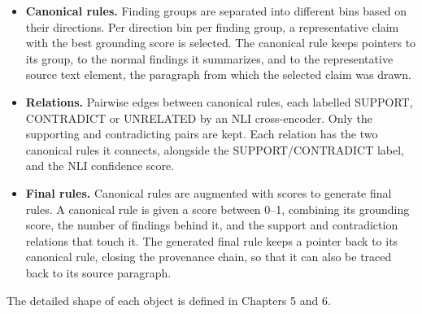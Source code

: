 \begin{itemize}[label={}, leftmargin=1.5em, itemsep=0.4em]
    \item \textbf{Canonical rules.} Finding groups are separated into different bins based on their directions. Per direction bin per finding group, a representative claim with the best grounding score is selected. The canonical rule keeps pointers to its group, to the normal findings it summarizes, and to the representative source text element, the paragraph from which the selected claim was drawn.

    \item \textbf{Relations.} Pairwise edges between canonical rules, each labelled SUPPORT, CONTRADICT or UNRELATED by an NLI cross-encoder. Only the supporting and contradicting pairs are kept. Each relation has the two canonical rules it connects, alongside the SUPPORT/CONTRADICT label, and the NLI confidence score.

    \item \textbf{Final rules.} Canonical rules are augmented with scores to generate final rules. A canonical rule is given a score between 0--1, combining its grounding score, the number of findings behind it, and the support and contradiction relations that touch it. The generated final rule keeps a pointer back to its canonical rule, closing the provenance chain, so that it can also be traced back to its source paragraph.


\end{itemize}


The detailed shape of each object is defined in Chapters 5 and 6. 